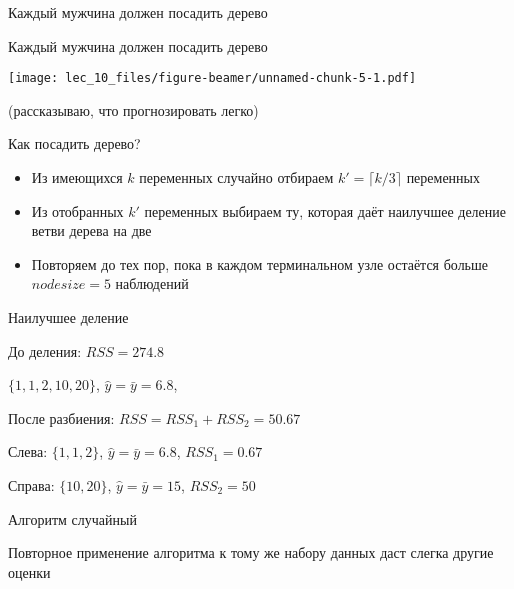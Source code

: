 \documentclass[ignorenonframetext,]{beamer}
\newcommand{\hy}{\hat{y}}
\begin{document}
\begin{frame}{Каждый мужчина должен посадить дерево}
\end{frame}

\begin{frame}{Каждый мужчина должен посадить дерево}

\texttt{[image: lec\_10\_files/figure-beamer/unnamed-chunk-5-1.pdf]}

(рассказываю, что прогнозировать легко)

\end{frame}

\begin{frame}{Как посадить дерево?}

\begin{itemize}
\item
  Из имеющихся \(k\) переменных случайно отбираем
  \(k'=\lceil k/3 \rceil\) переменных
\item
  Из отобранных \(k'\) переменных выбираем ту, которая даёт наилучшее
  деление ветви дерева на две
\item
  Повторяем до тех пор, пока в каждом терминальном узле остаётся больше
  \(nodesize=5\) наблюдений
\end{itemize}

\end{frame}

\begin{frame}{Наилучшее деление}

До деления: \(RSS=274.8\)

\(\{ 1, 1, 2, 10, 20\}\), \(\hy=\bar{y}=6.8\),

После разбиения: \(RSS=RSS_1+RSS_2=50.67\)

Слева: \(\{ 1, 1, 2 \}\), \(\hy=\bar{y}=6.8\), \(RSS_1=0.67\)

Справа: \(\{10,20\}\), \(\hy=\bar{y}=15\), \(RSS_2=50\)

\end{frame}

\begin{frame}{Алгоритм случайный}

Повторное применение алгоритма к тому же набору данных даст слегка
другие оценки

\end{frame}
\end{document}
